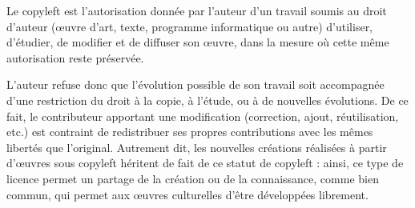 \documentclass[12pt]{../fiche}
\begin{document}


Le copyleft est l'autorisation donnée par l'auteur d'un travail soumis au droit d'auteur (œuvre d'art, texte, programme informatique ou autre) d'utiliser, d'étudier, de modifier et de diffuser son œuvre, dans la mesure où cette même autorisation reste préservée.

L'auteur refuse donc que l'évolution possible de son travail soit accompagnée d'une restriction du droit à la copie, à l'étude, ou à de nouvelles évolutions. De ce fait, le contributeur apportant une modification (correction, ajout, réutilisation, etc.) est contraint de redistribuer ses propres contributions avec les mêmes libertés que l'original. Autrement dit, les nouvelles créations réalisées à partir d'œuvres sous copyleft héritent de fait de ce statut de copyleft : ainsi, ce type de licence permet un partage de la création ou de la connaissance, comme bien commun, qui permet aux œuvres culturelles d'être développées librement.
\end{document}
